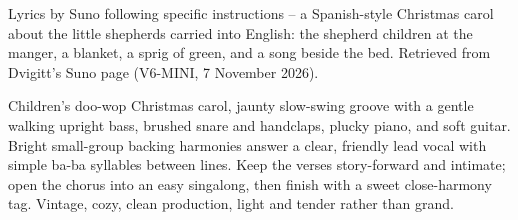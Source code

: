 
\label{sec:stars-keep-watch}
\begin{notes}
Lyrics by Suno following specific instructions -- a Spanish-style Christmas carol about the little shepherds carried into English: the shepherd children at the manger, a blanket, a sprig of green, and a song beside the bed. Retrieved from Dvigitt's Suno page (V6-MINI, 7 November 2026).
\end{notes}
\begin{style}
Children’s doo-wop Christmas carol, jaunty slow-swing groove with a gentle walking upright bass, brushed snare and handclaps, plucky piano, and soft guitar. Bright small-group backing harmonies answer a clear, friendly lead vocal with simple ba-ba syllables between lines. Keep the verses story-forward and intimate; open the chorus into an easy singalong, then finish with a sweet close-harmony tag. Vintage, cozy, clean production, light and tender rather than grand.
\end{style}
